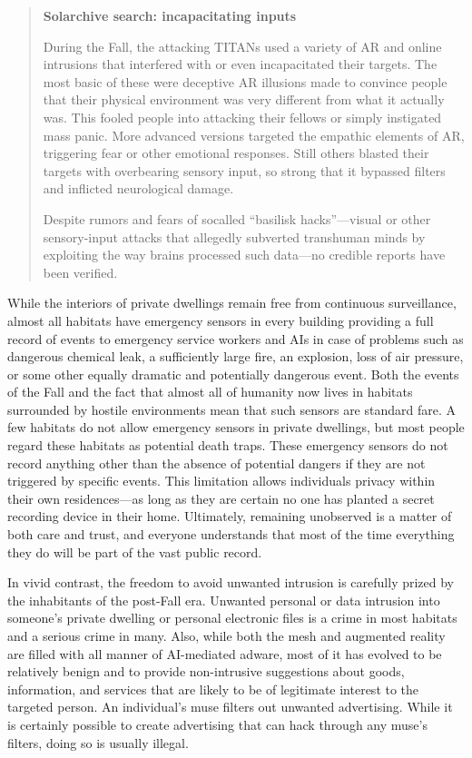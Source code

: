 \begin{quotation}
  \textbf{Solarchive search: incapacitating inputs}
  
  During the Fall, the attacking TITANs used a variety of AR and
  online intrusions that interfered with or even incapacitated their
  targets. The most basic of these were deceptive AR illusions made to
  convince people that their physical environment was very different
  from what it actually was. This fooled people into attacking their
  fellows or simply instigated mass panic. More advanced versions
  targeted the empathic elements of AR, triggering fear or other
  emotional responses. Still others blasted their targets with
  overbearing sensory input, so strong that it bypassed filters and
  inflicted neurological damage.

  Despite rumors and fears of socalled “basilisk hacks”—visual or
  other sensory-input attacks that allegedly subverted transhuman
  minds by exploiting the way brains processed such data—no credible
  reports have been verified.
\end{quotation}

While the interiors of private dwellings remain free from continuous
surveillance, almost all habitats have emergency sensors in every
building providing a full record of events to emergency service
workers and AIs in case of problems such as dangerous chemical leak, a
sufficiently large fire, an explosion, loss of air pressure, or some
other equally dramatic and potentially dangerous event. Both the
events of the Fall and the fact that almost all of humanity now lives
in habitats surrounded by hostile environments mean that such sensors
are standard fare. A few habitats do not allow emergency sensors in
private dwellings, but most people regard these habitats as potential
death traps.  These emergency sensors do not record anything other
than the absence of potential dangers if they are not triggered by
specific events. This limitation allows individuals privacy within
their own residences—as long as they are certain no one has planted a
secret recording device in their home. Ultimately, remaining
unobserved is a matter of both care and trust, and everyone
understands that most of the time everything they do will be part of
the vast public record.

In vivid contrast, the freedom to avoid unwanted intrusion is
carefully prized by the inhabitants of the post-Fall era. Unwanted
personal or data intrusion into someone's private dwelling or personal
electronic files is a crime in most habitats and a serious crime in
many. Also, while both the mesh and augmented reality are filled with
all manner of AI-mediated adware, most of it has evolved to be
relatively benign and to provide non-intrusive suggestions about
goods, information, and services that are likely to be of legitimate
interest to the targeted person. An individual's muse filters out
unwanted advertising. While it is certainly possible to create
advertising that can hack through any muse's filters, doing so is
usually illegal.

